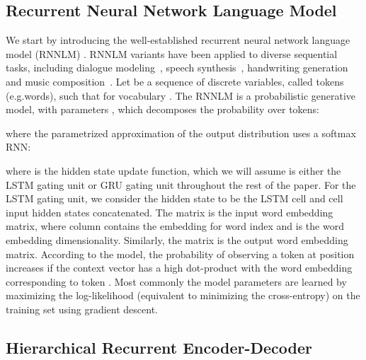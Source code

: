 \documentclass{article}
\begin{document}
\subsection{Recurrent Neural Network Language Model}
We start by introducing the well-established recurrent neural network language model (RNNLM) \cite{mikolov2010recurrent,bengio2003neural}. 
RNNLM variants have been applied to diverse sequential tasks, including dialogue modeling~\cite{DBLP:conf/aaai/SerbanSBCP16}, speech synthesis~\cite{chung2015recurrent}, handwriting generation~\cite{graves2013generating} and music composition~\cite{boulanger2012modeling}. Let  be a sequence of discrete variables, called tokens (e.g.\@ words), such that  for vocabulary .
The RNNLM is a probabilistic generative model,
with parameters ,
which decomposes the probability over tokens:

where the parametrized approximation of the output distribution uses a softmax RNN:

where  is the hidden state update function, which we will assume is either the LSTM gating unit \cite{hochreiter1997long} or GRU gating unit \cite{cho2014learning} throughout the rest of the paper. For the LSTM gating unit, we consider the hidden state  to be the LSTM cell and cell input hidden states concatenated.
The matrix  is the input word embedding matrix, where column  contains the embedding for word index  and  is the word embedding dimensionality. 
Similarly, the matrix  is the output word embedding matrix.
According to the model, the probability of observing a token  at position  increases if the context vector  has a high dot-product with the word embedding corresponding to token .
Most commonly the model parameters are learned by maximizing the log-likelihood (equivalent to minimizing the cross-entropy) on the training set using gradient descent. 

\subsection{Hierarchical Recurrent Encoder-Decoder}
\label{subseq:hred}
\end{document}
